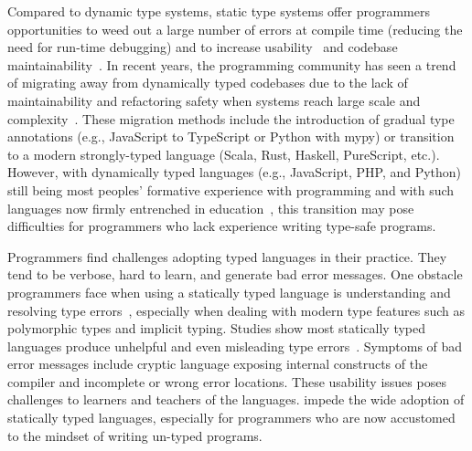 Compared to dynamic type systems, static type systems offer programmers opportunities to weed out a large number of errors at compile time (reducing the need for run-time debugging) and to increase usability~\cite{mayer2012static} and codebase maintainability~\cite{kleinschmager2012static}. In recent years, the programming community has seen a trend of migrating away from dynamically typed codebases due to the lack of maintainability and refactoring safety when systems reach large scale and complexity~\cite{chatley2019next700}. These migration methods include the introduction of gradual type annotations (e.g., JavaScript to TypeScript or Python with mypy) or transition to a modern strongly-typed language (Scala, Rust, Haskell, PureScript, etc.). However, with dynamically typed languages (e.g., JavaScript, PHP, and Python) still being most peoples' formative experience with programming and with such languages now firmly entrenched in education~\cite{so2022survey}, this transition may pose difficulties for programmers who lack experience writing type-safe programs.


Programmers find challenges adopting typed languages in their practice. They tend to be verbose, hard to learn, and generate bad error messages. 
One obstacle programmers face when using a statically typed language is understanding and resolving type errors~\cite{marceau2011measuring, tirronen2015understanding}, especially when dealing with modern type features such as polymorphic types and implicit typing. Studies show most statically typed languages produce unhelpful and even misleading type errors~\cite{yang2000improved}. Symptoms of bad error messages include cryptic language exposing internal constructs of the compiler and incomplete or wrong error locations. These usability issues poses challenges to learners and teachers of the languages. impede the wide adoption of statically typed languages, especially for programmers who are now accustomed to the mindset of writing un-typed programs.



